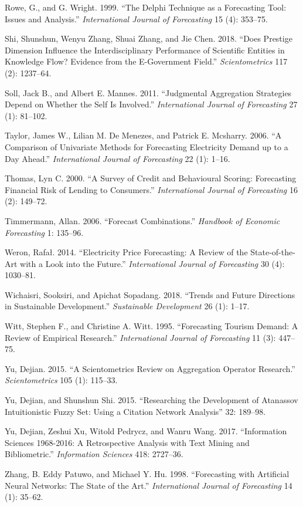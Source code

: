 \documentclass[11pt,a4paper]{elsarticle} %
\begin{document}
\hypertarget{ref-Rowe1999The}{}
Rowe, G., and G. Wright. 1999. ``The Delphi Technique as a Forecasting
Tool: Issues and Analysis.'' \emph{International Journal of Forecasting}
15 (4): 353--75.

\hypertarget{ref-Shi2018Does}{}
Shi, Shunshun, Wenyu Zhang, Shuai Zhang, and Jie Chen. 2018. ``Does
Prestige Dimension Influence the Interdisciplinary Performance of
Scientific Entities in Knowledge Flow? Evidence from the E-Government
Field.'' \emph{Scientometrics} 117 (2): 1237--64.

\hypertarget{ref-Soll2011Judgmental}{}
Soll, Jack B., and Albert E. Mannes. 2011. ``Judgmental Aggregation
Strategies Depend on Whether the Self Is Involved.'' \emph{International
Journal of Forecasting} 27 (1): 81--102.

\hypertarget{ref-Taylor2006}{}
Taylor, James W., Lilian M. De Menezes, and Patrick E. Mcsharry. 2006.
``A Comparison of Univariate Methods for Forecasting Electricity Demand
up to a Day Ahead.'' \emph{International Journal of Forecasting} 22 (1):
1--16.

\hypertarget{ref-Thomas2000A}{}
Thomas, Lyn C. 2000. ``A Survey of Credit and Behavioural Scoring:
Forecasting Financial Risk of Lending to Consumers.''
\emph{International Journal of Forecasting} 16 (2): 149--72.

\hypertarget{ref-Timmermann2006}{}
Timmermann, Allan. 2006. ``Forecast Combinations.'' \emph{Handbook of
Economic Forecasting} 1: 135--96.

\hypertarget{ref-Weron2014Electricity}{}
Weron, Rafał. 2014. ``Electricity Price Forecasting: A Review of the
State-of-the-Art with a Look into the Future.'' \emph{International
Journal of Forecasting} 30 (4): 1030--81.

\hypertarget{ref-Wichaisri2018Trends}{}
Wichaisri, Sooksiri, and Apichat Sopadang. 2018. ``Trends and Future
Directions in Sustainable Development.'' \emph{Sustainable Development}
26 (1): 1--17.

\hypertarget{ref-Witt1995Forecasting}{}
Witt, Stephen F., and Christine A. Witt. 1995. ``Forecasting Tourism
Demand: A Review of Empirical Research.'' \emph{International Journal of
Forecasting} 11 (3): 447--75.

\hypertarget{ref-Yu2015A}{}
Yu, Dejian. 2015. ``A Scientometrics Review on Aggregation Operator
Research.'' \emph{Scientometrics} 105 (1): 115--33.

\hypertarget{ref-Yu2015Researching}{}
Yu, Dejian, and Shunshun Shi. 2015. ``Researching the Development of
Atanassov Intuitionistic Fuzzy Set: Using a Citation Network Analysis''
32: 189--98.

\hypertarget{ref-Yu2017Information}{}
Yu, Dejian, Zeshui Xu, Witold Pedrycz, and Wanru Wang. 2017.
``Information Sciences 1968-2016: A Retrospective Analysis with Text
Mining and Bibliometric.'' \emph{Information Sciences} 418: 2727--36.

\hypertarget{ref-Zhang1998}{}
Zhang, B. Eddy Patuwo, and Michael Y. Hu. 1998. ``Forecasting with
Artificial Neural Networks: The State of the Art.'' \emph{International
Journal of Forecasting} 14 (1): 35--62.
\end{document}
